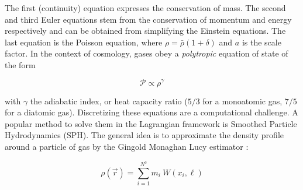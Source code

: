 The first (continuity) equation expresses the conservation of mass. The second and third Euler equations stem from the conservation of momentum and energy respectively and can be obtained from simplifying the Einstein equations. The last equation is the Poisson equation, where $\rho = \bar{\rho} (1+\delta)$ and $a$ is the scale factor. In the context of cosmology, gases obey a \emph{polytropic} equation of state of the form

\begin{equation}
\mathcal{P} \propto \rho^\gamma
\end{equation} 

with $\gamma$ the adiabatic index, or heat capacity ratio ($5/3$ for a monoatomic gas, $7/5$ for a diatomic gas). Discretizing these equations are a computational challenge. A popular method to solve them in the Lagrangian framework is Smoothed Particle Hydrodynamics (SPH). The general idea is to approximate the density profile around a particle of gas by the Gingold Monaghan Lucy estimator \citep{Gingold1977, Lucy1977}:

\begin{equation}
\label{eq:SPH_estimator}
\rho(\vec{r}) = \sum_{i=1}^{N^3} m_i~W(x_i, \ell)
\end{equation} 

